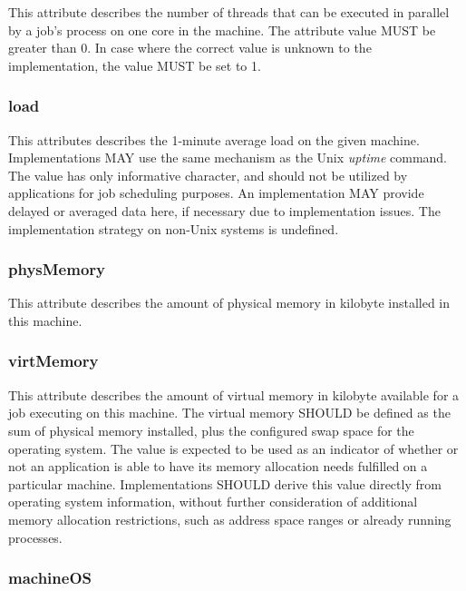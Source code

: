 \documentclass{article}
\newcommand{\rat}[1]{}
\begin{document}
This attribute describes the number of threads that can be executed in parallel by a job's process on one core in the machine. The attribute value MUST be greater than 0. In case where the correct value is unknown to the implementation, the value MUST be set to 1.

\subsubsection{load}

This attributes describes the 1-minute average load on the given machine. Implementations MAY use the same mechanism as the Unix \emph{uptime} command. The value has only informative character, and should not be utilized by applications for job scheduling purposes. An implementation MAY provide delayed or averaged data here, if necessary due to implementation issues. The implementation strategy on non-Unix systems is undefined.

\rat{In July 2011, there was a short debate on the list if this value should be normalized by the library to $<0,1>$. It was rejected, since DRMAA should just forward given information from the DRM / OS, for which the maximum value is typically not known. }

\subsubsection{physMemory}

This attribute describes the amount of physical memory in kilobyte installed in this machine.

\subsubsection{virtMemory}

This attribute describes the amount of virtual memory in kilobyte available for a job executing on this machine. The virtual memory SHOULD be defined as the sum of physical memory installed, plus the configured swap space for the operating system. The value is expected to be used as an indicator of whether or not an application is able to have its memory allocation needs fulfilled on a particular machine. Implementations SHOULD derive this value directly from operating system information, without further consideration of additional memory allocation restrictions, such as address space ranges or already running processes.

\subsubsection{machineOS}
\end{document}

